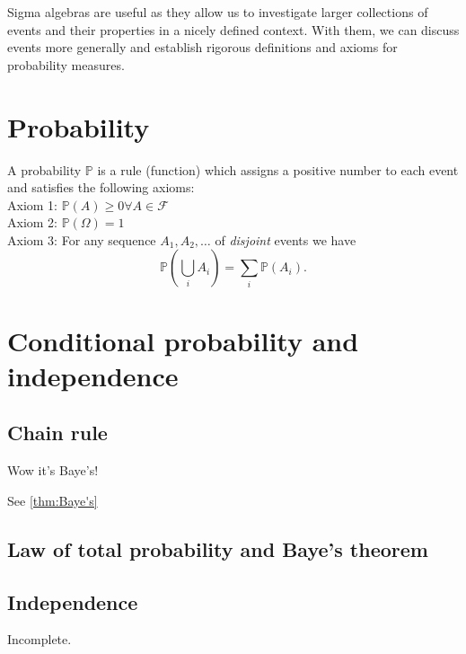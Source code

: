 Sigma algebras are useful as they allow us to investigate 
larger collections of events and their properties in a 
nicely defined context. With them, we can discuss 
events more generally and establish 
rigorous definitions and axioms for probability measures. 

\section{Probability}

\begin{definition}[Probability]\label{defn:probability}
    A probability \(\mathbb{P}\) is a rule (function) which assigns 
    a positive number to each event and satisfies the following axioms:\\
    Axiom 1: \(\mathbb{P}(A)\geq0 \forall A\in\mathcal{F}\)\\
    Axiom 2: \(\mathbb{P}(\Omega)=1\)\\
    Axiom 3: For any sequence \(A_1,A_2,\ldots \) of \textit{disjoint} events we have
    \[\mathbb{P}(\bigcup_{i}A_i) = \sum_i \mathbb{P}(A_i)\tag{1.3}.\]
\end{definition}

\section{Conditional probability and independence}

\subsection{Chain rule}

\begin{theorem}
    Wow it's Baye's!
\end{theorem}

See \cref{thm:Baye's}

\subsection{Law of total probability and Baye's theorem}


    

\subsection{Independence}

Incomplete. 